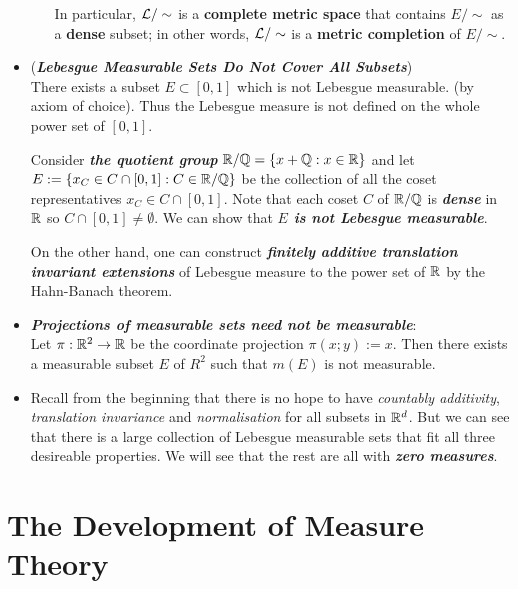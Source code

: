 \documentclass[11pt]{article}
\begin{document}
\begin{itemize}
\begin{exercise}
\begin{enumerate}
In particular,  ${\mathcal L}/\sim$ is a \textbf{complete metric space} that contains $E/\sim$ as a \textbf{dense} subset; in other words, ${\mathcal L}/\sim$ is a \textbf{metric completion} of $E/\sim$.
\end{enumerate}
\end{exercise}

\item \begin{remark} (\emph{\textbf{Lebesgue Measurable Sets Do Not Cover All Subsets}})\\
There exists a subset $E \subset [0, 1]$ which is not Lebesgue measurable. (by axiom of choice). Thus the Lebesgue measure is not defined on the whole power set of $[0,1]$.

Consider \emph{\textbf{the quotient group}} ${\mathbb R} / {\mathbb Q} = \left\{x + {\mathbb Q}: x \in {\mathbb R}\right\}$ and let $E := \left\{x_C \in C\cap [0,1]: C \in {\mathbb R} / {\mathbb Q}\right\}$ be the collection of all the coset representatives $x_C \in C \cap [0,1]$. Note that each coset $C$ of ${\mathbb R} / {\mathbb Q}$ is \emph{\textbf{dense}} in ${\mathbb R}$ so $C \cap [0,1] \neq \emptyset$. We can show that \emph{\textbf{$E$ is not Lebesgue measurable}}.


On the other hand, one can construct \emph{\textbf{finitely additive translation invariant extensions} }of Lebesgue measure to the power set of ${\mathbb R}$ by the Hahn-Banach theorem.
\end{remark}

\item \begin{example} \emph{\textbf{Projections of measurable sets need not be measurable}}: \\
Let $\pi : {\mathbb R}^2 \rightarrow {\mathbb R}$ be the coordinate projection $\pi(x; y) := x$. Then there exists a measurable subset $E$ of $R^{2}$ such that $m(E)$ is not measurable.
\end{example}

\item \begin{remark}
Recall from the beginning that there is no hope to have \emph{countably additivity}, \emph{translation invariance} and \emph{normalisation} for all subsets in ${\mathbb R}^{d}$. But we can see that there is a large collection of Lebesgue measurable sets that fit all three desireable properties. We will see that the rest are all with \emph{\textbf{zero measures}}. 
\end{remark}
\end{itemize}


\newpage
\section{The Development of Measure Theory}
\end{document}
